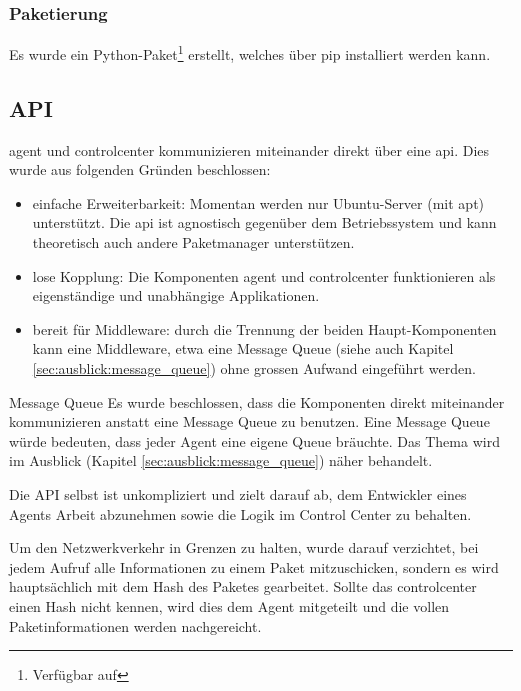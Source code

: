 \subsubsection*{Paketierung}

Es wurde ein Python-Paket\footnote{Verfügbar auf } erstellt, welches über \gls{pip} installiert werden kann.

\clearpage
\subsection*{API} \label{sec:architecture:api}

\gls{agent} und \gls{controlcenter} kommunizieren miteinander direkt über eine \gls{api}. Dies wurde aus folgenden Gründen beschlossen:

\begin{itemize}
    \item einfache Erweiterbarkeit: Momentan werden nur Ubuntu-Server (mit \gls{apt}) unterstützt. Die \gls{api} ist agnostisch gegenüber dem Betriebssystem und kann theoretisch auch andere Paketmanager unterstützen.
    \item lose Kopplung: Die Komponenten \gls{agent} und \gls{controlcenter} funktionieren als eigenständige und unabhängige Applikationen.
    \item bereit für Middleware: durch die Trennung der beiden Haupt-Komponenten kann eine Middleware, etwa eine Message Queue (siehe auch Kapitel \ref{sec:ausblick:message_queue}) ohne grossen Aufwand eingeführt werden.
\end{itemize}


\begin{decision}{Message Queue}
Es wurde beschlossen, dass die Komponenten direkt miteinander kommunizieren anstatt eine Message Queue zu benutzen. Eine Message Queue würde bedeuten, dass jeder Agent eine eigene Queue bräuchte. Das Thema wird im Ausblick (Kapitel \ref{sec:ausblick:message_queue}) näher behandelt.
\end{decision}


Die API selbst ist unkompliziert und zielt darauf ab, dem Entwickler eines Agents Arbeit abzunehmen sowie die Logik im Control Center zu behalten.

Um den Netzwerkverkehr in Grenzen zu halten, wurde darauf verzichtet, bei jedem Aufruf alle Informationen zu einem Paket mitzuschicken, sondern es wird hauptsächlich mit dem Hash des Paketes gearbeitet. Sollte das \gls{controlcenter} einen Hash nicht kennen, wird dies dem Agent mitgeteilt und die vollen Paketinformationen werden nachgereicht.

